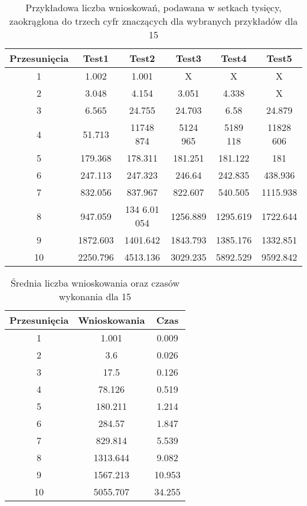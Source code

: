     \begin{table}[H]
        \centering
         \begin{tabular}{||c | c | c | c | c | c |} 
         \hline
         Przesunięcia & Test1 & Test2 & Test3 & Test4 & Test5 \\ [0.5ex] 
         \hline\hline
         1 & 1.002 & 1.001 & X & X & X \\ 
         \hline
         2 & 3.048 & 4.154 & 3.051 & 4.338 & X \\
         \hline
         3 & 6.565 & 24.755 & 24.703 & 6.58 & 24.879 \\
         \hline
         4 & 51.713 & 11748 874 & 5124 965 & 5189 118 & 11828 606 \\
         \hline
         5 & 179.368 & 178.311 & 181.251 & 181.122 & 181 \\
         \hline
         6 & 247.113 & 247.323 & 246.64 & 242.835 & 438.936\\ 
         \hline
         7 & 832.056 & 837.967 & 822.607 & 540.505 & 1115.938 \\
         \hline
         8 & 947.059 & 134 6.01 054 & 1256.889 & 1295.619 & 1722.644\\
         \hline
         9 & 1872.603 & 1401.642 & 1843.793 & 1385.176 & 1332.851\\
         \hline
         10 & 2250.796 & 4513.136  & 3029.235 & 5892.529 & 9592.842 \\ [1ex]
         \hline
         \end{tabular}
         \caption{Przykładowa liczba wnioskowań, podawana w setkach tysięcy, 
         zaokrąglona do trzech cyfr znaczących dla wybranych przykładów dla 15}
    \end{table}
    \begin{table}[H]
        \centering
         \begin{tabular}{||c | c | c|} 
         \hline
         Przesunięcia & Wnioskowania & Czas \\ [0.5ex] 
         \hline\hline
         1 & 1.001 & 0.009 \\ 
         \hline
         2 & 3.6 & 0.026 \\
         \hline
         3 & 17.5 & 0.126  \\
         \hline
         4 & 78.126 & 0.519  \\
         \hline
         5 & 180.211 & 1.214 \\
         \hline
         6 & 284.57 & 1.847 \\ 
         \hline
         7 & 829.814 & 5.539 \\
         \hline
         8 & 1313.644 & 9.082 \\
         \hline
         9 & 1567.213 & 10.953 \\
         \hline
         10 & 5055.707 & 34.255 \\ [1ex]
         \hline
         \end{tabular}
         \caption{Średnia liczba wnioskowania oraz czasów wykonania dla 15}
    \end{table}
